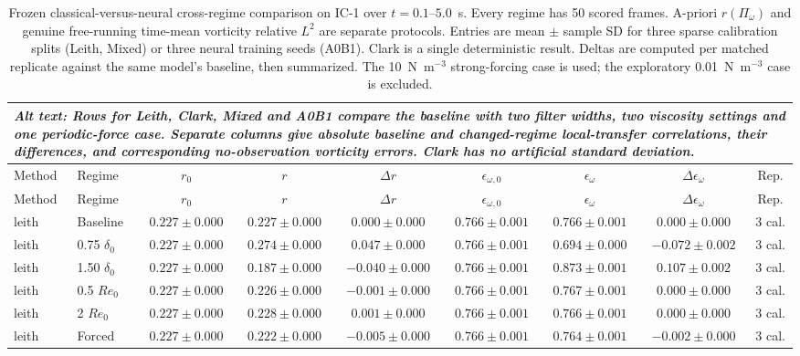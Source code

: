 \begin{landscape}
\small
\begin{longtable}{llccccccc}
\caption{Frozen classical-versus-neural cross-regime comparison on IC-1 over $t=0.1$--$5.0$~s. Every regime has 50 scored frames. A-priori $r(\Pi_\omega)$ and genuine free-running time-mean vorticity relative $L^2$ are separate protocols. Entries are mean $\pm$ sample SD for three sparse calibration splits (Leith, Mixed) or three neural training seeds (A0B1). Clark is a single deterministic result. Deltas are computed per matched replicate against the same model's baseline, then summarized. The 10~N~m$^{-3}$ strong-forcing case is used; the exploratory 0.01~N~m$^{-3}$ case is excluded.\label{tab:classical_transfer}}\\
\multicolumn{9}{p{0.96\linewidth}}{\textit{Alt text: Rows for Leith, Clark, Mixed and A0B1 compare the baseline with two filter widths, two viscosity settings and one periodic-force case. Separate columns give absolute baseline and changed-regime local-transfer correlations, their differences, and corresponding no-observation vorticity errors. Clark has no artificial standard deviation.}}\\
\toprule Method & Regime & $r_0$ & $r$ & $\Delta r$ & $\epsilon_{\omega,0}$ & $\epsilon_\omega$ & $\Delta\epsilon_\omega$ & Rep. \\\midrule\endfirsthead
\toprule Method & Regime & $r_0$ & $r$ & $\Delta r$ & $\epsilon_{\omega,0}$ & $\epsilon_\omega$ & $\Delta\epsilon_\omega$ & Rep. \\\midrule\endhead
leith & Baseline & $0.227\pm0.000$ & $0.227\pm0.000$ & $0.000\pm0.000$ & $0.766\pm0.001$ & $0.766\pm0.001$ & $0.000\pm0.000$ & 3 cal. \\
leith & 0.75 $\delta_0$ & $0.227\pm0.000$ & $0.274\pm0.000$ & $0.047\pm0.000$ & $0.766\pm0.001$ & $0.694\pm0.000$ & $-0.072\pm0.002$ & 3 cal. \\
leith & 1.50 $\delta_0$ & $0.227\pm0.000$ & $0.187\pm0.000$ & $-0.040\pm0.000$ & $0.766\pm0.001$ & $0.873\pm0.001$ & $0.107\pm0.002$ & 3 cal. \\
leith & 0.5 $Re_0$ & $0.227\pm0.000$ & $0.226\pm0.000$ & $-0.001\pm0.000$ & $0.766\pm0.001$ & $0.767\pm0.001$ & $0.000\pm0.000$ & 3 cal. \\
leith & 2 $Re_0$ & $0.227\pm0.000$ & $0.228\pm0.000$ & $0.001\pm0.000$ & $0.766\pm0.001$ & $0.766\pm0.001$ & $0.000\pm0.000$ & 3 cal. \\
leith & Forced & $0.227\pm0.000$ & $0.222\pm0.000$ & $-0.005\pm0.000$ & $0.766\pm0.001$ & $0.764\pm0.001$ & $-0.002\pm0.000$ & 3 cal. \\

\end{longtable}
\end{landscape}
